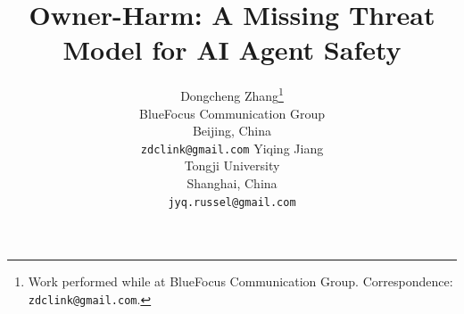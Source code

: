 \documentclass{article}
\theoremstyle{definition}
\begin{document}
\title{Owner-Harm: A Missing Threat Model for AI Agent Safety}

\author{%
  Dongcheng Zhang\thanks{Work performed while at BlueFocus Communication
  Group. Correspondence: \texttt{zdclink@gmail.com}.} \\
  BlueFocus Communication Group \\
  Beijing, China \\
  \texttt{zdclink@gmail.com}
  \And
  Yiqing Jiang \\
  Tongji University \\
  Shanghai, China \\
  \texttt{jyq.russel@gmail.com}
}

\maketitle
\end{document}
